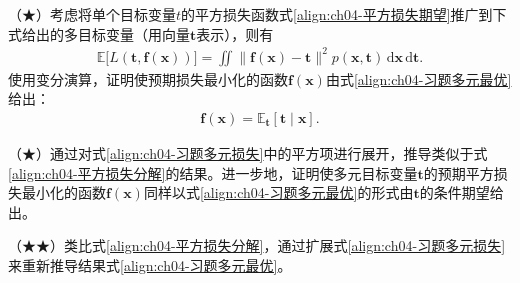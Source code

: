 \documentclass[../../main.tex]{subfiles}
\begin{document}
\begin{exercise}\label{exercise:ch04-08}
（★）考虑将单个目标变量$t$的平方损失函数式\eqref{align:ch04-平方损失期望}推广到下式给出的多目标变量（用向量$\boldsymbol{t}$表示），则有
\begin{align}
  \mathbb{E}\bigl[L(\boldsymbol{t},\boldsymbol{f}(\boldsymbol{x}))\bigr]=\iint\bigl\|\boldsymbol{f}(\boldsymbol{x})-\boldsymbol{t}\bigr\|^2p(\boldsymbol{x},\boldsymbol{t})\,\mathrm{d}\boldsymbol{x}\,\mathrm{d}\boldsymbol{t} .
  \label{align:ch04-习题多元损失}
\end{align}
使用变分演算，证明使预期损失最小化的函数$\boldsymbol{f}(\boldsymbol{x})$由式\eqref{align:ch04-习题多元最优}给出：
\begin{align}
  \boldsymbol{f}(\boldsymbol{x})=\mathbb{E}_{\boldsymbol{t}}[\boldsymbol{t}\mid\boldsymbol{x}] .
  \label{align:ch04-习题多元最优}
\end{align}
\end{exercise}

\begin{exercise}\label{exercise:ch04-09}
（★）通过对式\eqref{align:ch04-习题多元损失}中的平方项进行展开，推导类似于式\eqref{align:ch04-平方损失分解}的结果。进一步地，证明使多元目标变量$\boldsymbol{t}$的预期平方损失最小化的函数$\boldsymbol{f}(\boldsymbol{x})$同样以式\eqref{align:ch04-习题多元最优}的形式由$\boldsymbol{t}$的条件期望给出。
\end{exercise}

\begin{exercise}\label{exercise:ch04-10}
（★★）类比式\eqref{align:ch04-平方损失分解}，通过扩展式\eqref{align:ch04-习题多元损失}来重新推导结果式\eqref{align:ch04-习题多元最优}。
\end{exercise}
\end{document}
